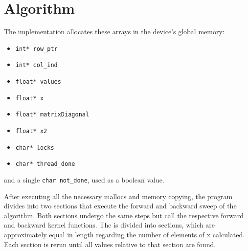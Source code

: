 \documentclass[a4paper,oneside]{report}
\begin{document}
    \section*{Algorithm}

    The implementation allocates these arrays in the device's global memory:
    \begin{itemize}
        \item \verb|int* row_ptr|
        \item \verb|int* col_ind|
        \item \verb|float* values|
        \item \verb|float* x|
        \item \verb|float* matrixDiagonal|
        \item \verb|float* x2|
        \item \verb|char* locks|
        \item \verb|char* thread_done|
    \end{itemize}
    and a single \verb|char not_done|, used as a boolean value.

    After executing all the necessary mallocs and memory copying, the program divides into two sections that execute the forward and backward sweep of the algorithm. Both sections undergo the same steps but call the respective forward and backward kernel functions. The  is divided into  sections, which are approximately equal in length regarding the number of elements of x calculated. Each section is rerun until all values relative to that section are found.
\end{document}

